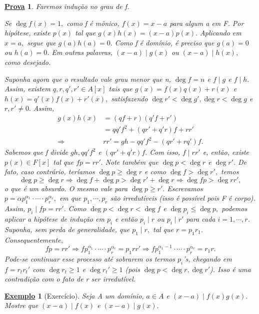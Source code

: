 \documentclass{article}
\newtheorem{example}{\underline{Exemplo}}
\newtheorem*{proof*}{\underline{Prova}}
\begin{document}
\begin{proof*}
  Faremos indução no grau de f.

  Se \(\deg{f(x)} = 1,\) como f é mônico, \(f(x) = x-a\) para algum a em F. Por hipótese, existe \(p(x)\) tal que
  \(g(x)h(x) = (x-a)p(x).\) Aplicando em \(x=a,\) segue que \(g(a)h(a) = 0.\) Como f é domínio, é preciso que
  \(g(a) = 0\) ou \(h(a) = 0\). Em outras palavras, \((x-a)\mid g(x)\) ou \((x-a)\mid h(x),\) como desejado.

  Suponha agora que o resultado vale grau menor que n, \(\deg{f} = n\) e \(f\mid g\) e \(f\mid h.\) Assim, existem 
  \(q, r, q', r'\in A[x]\) tais que \(g(x) = f(x)q(x) + r(x)\) e \(h(x) = q'(x)f(x) + r'(x),\) satisfazendo
  \(\deg{r'} < \deg{g'}, \deg{r} < \deg{g}\) e \(r, r'\neq 0.\) Assim,
  \begin{align*}
    g(x)h(x) &= (qf + r)(q'f + r')\\
             &= qq'f^{2} + (qr' + q'r)f + rr'\\
    \Rightarrow & rr' = gh - qq'f^{2} - (qr' + rq')f.
  \end{align*}
  Sabemos que f divide \(gh, qq'f^{2}\) e \((qr' + q'r)f.\) Com isso, \(f\mid rr'\) e, então,
  existe \(p(x)\in F[x]\) tal que \(fp = rr'.\) Note também que \(\deg{p} < \deg{r} \) e \(\deg{r'}.\) De fato,
  caso contrário, teríamos \(\deg{p}\geq \deg{r}\) e como \(\deg{f} > \deg{r'},\) temos 
  \[
    \deg{p}\geq \deg{r} \Rightarrow \deg{f} + \deg{p} > \deg{r'} + \deg{r} \Rightarrow \deg{fp} > \deg{rr'},
  \]
  o que é um absurdo. O mesmo vale para \(\deg{p}\geq r'.\) Escrevamos \(p = \alpha p_{1}^{\alpha_{1}}\cdot \cdots \cdot p_{r}^{\alpha_{r}},\) 
  em que \(p_{1}, \cdots, p_{r}\) são irredutíveis (isso é possível pois F é corpo). Assim, \(p_{i}\mid fp = rr'.\) 
  Como \(\deg{p} < \deg{r} < \deg{f}\) e \(\deg{p_{i}}\leq \deg{p},\) podemos aplicar a hipótese de indução em \(p_{i}\) e então
  \(p_{i}\mid r\) ou \(p_{i}\mid r'\) para cada \(i=1, \cdots, r\). Suponha, sem perda de generalidade, que \(p_{1}\mid r,\) tal que 
  \(r=p_{1}r_{1}\). Consequentemente, 
  \[
    fp = rr' \Rightarrow fp_{1}^{\alpha_{1}}\cdot \cdots \cdot p_{r}^{\alpha_{r}} = p_{1}rr' \Rightarrow fp_{1}^{\alpha_{1} -1}\cdot \cdots \cdot p_{r}^{\alpha_{r}} = r_{1}r.
  \]
  Pode-se continuar esse processo até sobrarem os termos \(p_{i}\)'s, chegando em
  \(f = r_{t}r_{t}'\) com \(\deg{r_{t}}\geq 1\) e \(\deg{r_{t}'}\geq 1\) (pois \(\deg{p} < \deg{r}, \deg{r'}\)). Isso é uma contradição
  com o fato de r ser irredutível.
\end{proof*}
\begin{example}[Exercício]
  Seja A um domínio, \(a\in A\) e \((x-a)\mid f(x)g(x).\) Mostre que \((x-a)\mid f(x)\) e \((x-a)\mid g(x).\) 
\end{example}
\end{document}
